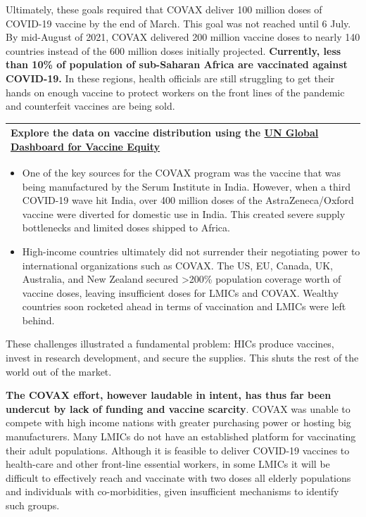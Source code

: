 \documentclass[
  11pt,
  paper=a4,
  ,captions=tableheading
]{scrartcl}
\providecommand{\tightlist}{%
  \setlength{\itemsep}{0pt}\setlength{\parskip}{0pt}}
\begin{document}
Ultimately, these goals required that COVAX deliver 100 million doses of
COVID-19 vaccine by the end of March. This goal was not reached until 6
July. By mid-August of 2021, COVAX delivered 200 million vaccine doses
to nearly 140 countries instead of the 600 million doses initially
projected. \textbf{Currently, less than 10\% of population of
sub-Saharan Africa are vaccinated against COVID-19.} In these regions,
health officials are still struggling to get their hands on enough
vaccine to protect workers on the front lines of the pandemic and
counterfeit vaccines are being sold.

\begin{longtable}[]{@{}
  >{\raggedright\arraybackslash}p{}@{}}
\toprule
\endhead
Explore the data on vaccine distribution using the
\href{https://data.undp.org/vaccine-equity/}{UN Global Dashboard for
Vaccine Equity} \\
\bottomrule
\end{longtable}

\begin{itemize}
\tightlist
\item
  One of the key sources for the COVAX program was the vaccine that was
  being manufactured by the Serum Institute in India. However, when a
  third COVID-19 wave hit India, over 400 million doses of the
  AstraZeneca/Oxford vaccine were diverted for domestic use in India.
  This created severe supply bottlenecks and limited doses shipped to
  Africa.
\item
  High-income countries ultimately did not surrender their negotiating
  power to international organizations such as COVAX. The US, EU,
  Canada, UK, Australia, and New Zealand secured \textgreater200\%
  population coverage worth of vaccine doses, leaving insufficient doses
  for LMICs and COVAX. Wealthy countries soon rocketed ahead in terms of
  vaccination and LMICs were left behind.
\end{itemize}

These challenges illustrated a fundamental problem: HICs produce
vaccines, invest in research development, and secure the supplies. This
shuts the rest of the world out of the market.

\textbf{The COVAX effort, however laudable in intent, has thus far been
undercut by lack of funding and vaccine scarcity}. COVAX was unable to
compete with high income nations with greater purchasing power or
hosting big manufacturers. Many LMICs do not have an established
platform for vaccinating their adult populations. Although it is
feasible to deliver COVID-19 vaccines to health-care and other
front-line essential workers, in some LMICs it will be difficult to
effectively reach and vaccinate with two doses all elderly populations
and individuals with co-morbidities, given insufficient mechanisms to
identify such groups.
\end{document}
